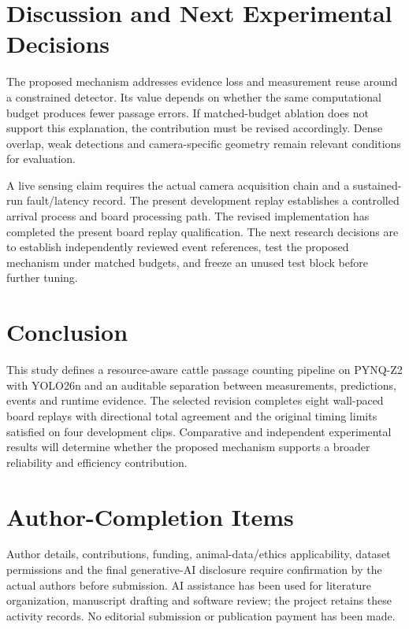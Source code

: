\documentclass[journal]{IEEEtran}
\begin{document}
\section{Discussion and Next Experimental Decisions}
The proposed mechanism addresses evidence loss and measurement reuse around a constrained detector. Its value depends on whether the same computational budget produces fewer passage errors. If matched-budget ablation does not support this explanation, the contribution must be revised accordingly. Dense overlap, weak detections and camera-specific geometry remain relevant conditions for evaluation.

A live sensing claim requires the actual camera acquisition chain and a sustained-run fault/latency record. The present development replay establishes a controlled arrival process and board processing path. The revised implementation has completed the present board replay qualification. The next research decisions are to establish independently reviewed event references, test the proposed mechanism under matched budgets, and freeze an unused test block before further tuning.

\section{Conclusion}
This study defines a resource-aware cattle passage counting pipeline on PYNQ-Z2 with YOLO26n and an auditable separation between measurements, predictions, events and runtime evidence. The selected revision completes eight wall-paced board replays with directional total agreement and the original timing limits satisfied on four development clips. Comparative and independent experimental results will determine whether the proposed mechanism supports a broader reliability and efficiency contribution.

\section*{Author-Completion Items}
Author details, contributions, funding, animal-data/ethics applicability, dataset permissions and the final generative-AI disclosure require confirmation by the actual authors before submission. AI assistance has been used for literature organization, manuscript drafting and software review; the project retains these activity records. No editorial submission or publication payment has been made.



\end{document}
